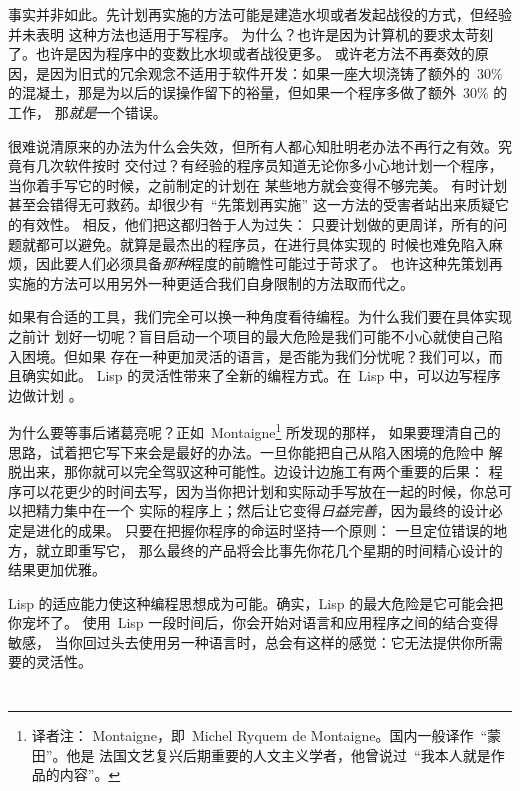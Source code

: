 事实并非如此。先计划再实施的方法可能是建造水坝或者发起战役的方式，但经验并未表明
这种方法也适用于写程序。
为什么？也许是因为计算机的要求太苛刻了。也许是因为程序中的变数比水坝或者战役更多。
或许老方法不再奏效的原因，是因为旧式的冗余观念不适用于软件开发：如果一座大坝浇铸了额外的~$30\%$
的混凝土，那是为以后的误操作留下的裕量，但如果一个程序多做了额外~$30\%$ 的工作，
那\emph{就是}一个错误。

很难说清原来的办法为什么会失效，但所有人都心知肚明老办法不再行之有效。究竟有几次软件按时
交付过？有经验的程序员知道无论你多小心地计划一个程序，当你着手写它的时候，之前制定的计划在
某些地方就会变得不够完美。
有时计划甚至会错得无可救药。却很少有~``先策划再实施'' 这一方法的受害者站出来质疑它的有效性。
相反，他们把这都归咎于人为过失：
只要计划做的更周详，所有的问题就都可以避免。就算是最杰出的程序员，在进行具体实现的
时候也难免陷入麻烦，因此要人们必须具备\emph{那种}程度的前瞻性可能过于苛求了。
也许这种先策划再实施的方法可以用另外一种更适合我们自身限制的方法取而代之。

如果有合适的工具，我们完全可以换一种角度看待编程。为什么我们要在具体实现之前计
划好一切呢？盲目启动一个项目的最大危险是我们可能不小心就使自己陷入困境。但如果
存在一种更加灵活的语言，是否能为我们分忧呢？我们可以，而且确实如此。
Lisp 的灵活性带来了全新的编程方式。在~Lisp 中，可以边写程序边做计划
。

为什么要等事后诸葛亮呢？正如~Montaigne\footnote{译者注：
Montaigne，即~Michel Ryquem de Montaigne。国内一般译作~``蒙田''。他是
法国文艺复兴后期重要的人文主义学者，他曾说过~``我本人就是作品的内容''。}
所发现的那样，
如果要理清自己的思路，试着把它写下来会是最好的办法。一旦你能把自己从陷入困境的危险中
解脱出来，那你就可以完全驾驭这种可能性。边设计边施工有两个重要的后果：
程序可以花更少的时间去写，因为当你把计划和实际动手写放在一起的时候，你总可以把精力集中在一个
实际的程序上；然后让它变得\emph{日益完善}，因为最终的设计必定是进化的成果。
只要在把握你程序的命运时坚持一个原则：
一旦定位错误的地方，就立即重写它，
那么最终的产品将会比事先你花几个星期的时间精心设计的结果更加优雅。

Lisp 的适应能力使这种编程思想成为可能。确实，Lisp 的最大危险是它可能会把你宠坏了。
使用~Lisp 一段时间后，你会开始对语言和应用程序之间的结合变得敏感，
当你回过头去使用另一种语言时，总会有这样的感觉：它无法提供你所需要的灵活性。

\section{\bup}
\label{sec:programming_bottom-up}

